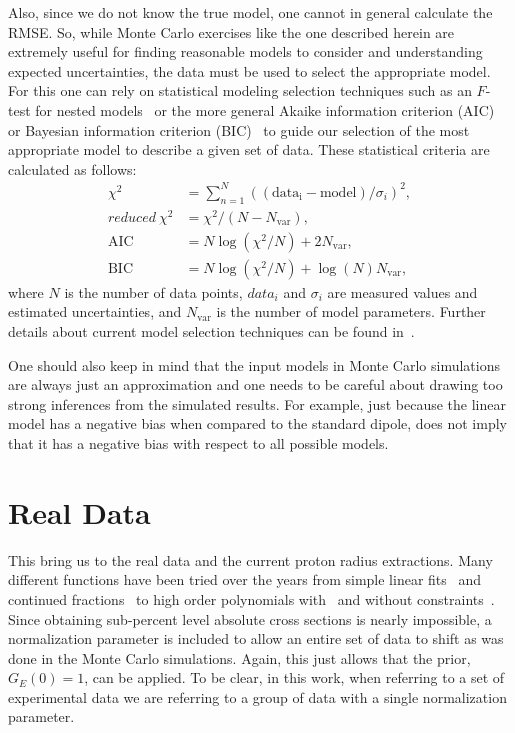 \documentclass[10pt,superscriptaddress,aps,prc,twocolumn]{revtex4-1}
\begin{document}
Also, since we do not know the true model, one cannot in general calculate the RMSE. So, while Monte Carlo exercises 
like the one described herein are extremely useful for finding reasonable models to consider and understanding
expected uncertainties, the data must be used to select the appropriate model. 
For this one can rely on statistical modeling selection techniques such as an $F$-test for
nested models~\cite{Bevington:2003,James:2006,Sirca:2016} or the more general Akaike information criterion (AIC)~\cite{Akaike:1974} 
or Bayesian information criterion (BIC)~\cite{Schwarz:1978} 
to guide our selection of the most appropriate model to describe a given set of data.
These statistical criteria are calculated as follows: 
\begin{align}
\chi^2         & = \sum_{n=1}^{N}((\mathrm{data_i} - \mathrm{model}) / \sigma_i)^2, \\
reduced~\chi^2 & = \chi^2/ (N - N_{\mathrm{var}}),  \\
\mathrm{AIC}            & = N \log(\chi^2/N) + 2 N_{\mathrm{var}}, \\
\mathrm{BIC}            & = N \log(\chi^2/N) + \log(N) N_{\mathrm{var}},
\end{align}
where $N$ is the number of data points, $data_i$ and $\sigma_i$ are measured values and estimated uncertainties,
and $N_{\mathrm{var}}$ is the number of model parameters.
Further details about current model selection techniques can be found in~\cite{Ernst:2012}.

One should also keep in mind that the input models in Monte Carlo simulations are always just an approximation
and one needs to be careful about drawing too strong inferences from the simulated results. 
For example, just because the linear model has a negative bias when compared to the standard dipole, 
does not imply that it has a negative bias with respect to all possible models.




\section{Real Data}

This bring us to the real data and the current proton radius extractions.   Many different functions have
been tried over the years from simple linear fits~\cite{Hand:1963zz,Murphy:1974zz} and continued fractions~\cite{Sick:2003gm} 
to high order polynomials with~\cite{Bernauer:2013tpr} and without constraints~\cite{Lee:2015jqa}.
Since obtaining sub-percent
level absolute cross sections is nearly impossible, a normalization parameter is included to allow an entire set of data to shift
as was done in the Monte Carlo simulations.   Again, this just allows that the prior, $G_E(0)=1$, can be applied.
To be clear, in this work, when referring to a set of experimental data we are referring to a group of data
with a single normalization parameter.
\end{document}
